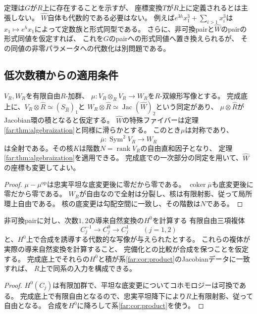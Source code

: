 \begin{remark}[代数化されるもの]\label{far:rem:scope}
定理は$G$が$R$上に存在することを示すが、
座標変換$T$が$R$上に定義されるとは主張しない。
$\widehat W$自体も代数的である必要はない。
例えば$e^{3h}x_1^3+\sum_{i>1}x_i^3$は
$x_1\mapsto e^h x_1$によって定数族と形式同型である。
さらに、非可換pairと$\widehat W$のpairの形式同値を仮定すれば、
これを$G$のpairへの形式同値へ置き換えられるが、
その同値の非零パラメータへの代数化は別問題である。
\end{remark}

\subsection{低次数積からの適用条件}

\begin{corollary}[代数的な低次数積があれば十分]\label{far:cor:product}
$V_R,W_R$を有限自由$R$-加群、
$\mu:V_R\otimes_RV_R\to W_R$を$R$-双線形写像とする。
完成底上に、$V_R\otimes\widehat R\simeq(S_{\widehat R})_1$と
$W_R\otimes\widehat R\simeq\operatorname{Jac}(\widehat W)_2$という同定があり、
$\mu\otimes\widehat R$がJacobian環の積となると仮定する。
$\widehat W$の特殊ファイバーは定理\ref{far:thm:algebraization}と同様に滑らかとする。
このとき$\mu$は対称であり、
\[
 \overline\mu:\operatorname{Sym}^2V_R\longrightarrow W_R
\]
は全射である。その核$K$は階数$N=\operatorname{rank}V_R$の自由直和因子となり、
定理\ref{far:thm:algebraization}を適用できる。
完成底での一次部分の同定を用いて、$\widehat W$の座標も変更してよい。
\end{corollary}
\begin{proof}
$\mu-\mu^{\mathrm{op}}$は忠実平坦な底変更後に零だから零である。
$\operatorname{coker}\overline\mu$も底変更後に零だから零である。
$W_R$が自由なので全射は分裂し、核は有限射影、従って局所環上自由である。
核の底変更は勾配空間に一致し、その階数は$N$である。
\end{proof}

\begin{proposition}[有限複体からの降下]\label{far:prop:finite-model}
非可換pairに対し、次数$1,2$の導来自然変換の$H^0$を計算する
有限自由三項複体
\[
 C_j^{-1}\longrightarrow C_j^0\longrightarrow C_j^1\qquad(j=1,2)
\]
と、$H^0$上で合成を誘導する代数的な写像が与えられたとする。
これらの複体が実際の導来自然変換を計算すること、
完備化との比較が合成を保つことを仮定する。
完成底上でそれらの$H^0$と積が系\ref{far:cor:product}のJacobianデータに一致すれば、
$R$上で同系の入力を構成できる。
\end{proposition}
\begin{proof}
$H^0(C_j)$は有限加群で、平坦な底変更についてコホモロジーは可換である。
完成底上で有限自由となるので、忠実平坦降下により$R$上有限射影、従って自由となる。
合成を$H^0$に降ろして系\ref{far:cor:product}を使う。
\end{proof}


